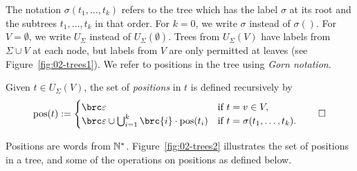 The notation $\sigma(t_1,\ldots,t_k)$ refers to the tree which has the label
$\sigma$ at its root and the subtrees $t_1,\ldots,t_k$ in that order. For
$k=0$, we write $\sigma$ instead of $\sigma()$. For $V=\emptyset$, we write
$U_\Sigma$ instead of $U_\Sigma(\emptyset)$. Trees from $U_\Sigma(V)$ have
labels from $\Sigma\cup V$ at each node, but labels from $V$ are only permitted
at leaves (see Figure~\ref{fig:02-trees1}). We refer to positions in the tree
using \emph{Gorn notation}.

\begin{definition}
 Given $t\in U_\Sigma(V)$, the set of \emph{positions} in $t$ is defined recursively by
 \[
  \pos(t) := \begin{cases}
   \brc\eps & \text{if } t = v\in V, \\
   \brc\eps\cup \bigcup_{i=1}^k \brc{i} \cdot \pos(t_i) & \text{if } t = \sigma(t_1,\ldots,t_k).
  \end{cases}
  \qedhere
 \]
\end{definition}

Positions are words from $\mathbb N^*$. Figure~\ref{fig:02-trees2} illustrates the
set of positions in a tree, and some of the operations on positions as defined
below.

